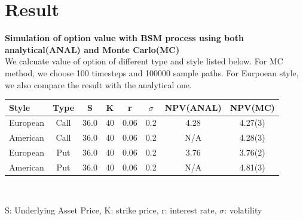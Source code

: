 \documentclass[a4paper]{article}
\begin{document}
\section{Result}
{\bf Simulation of option value with BSM process using both analytical(ANAL) and Monte Carlo(MC)}\\
We calcuate value of  option of different type and style listed below. For MC method, we choose 100 timesteps and 100000 sample paths. For Eurpoean style, we also compare the result with the analytical one.
\begin{table}
	\begin{tabular} { l  c  c   c  c  c       c       c          }
		Style 	 & Type & S  & K & r & $\sigma$ & NPV(ANAL) & NPV(MC)\\
	\hline 
		European & Call & 36.0 & 40 & 0.06 & 0.2 & 4.28 & 4.27(3) \\
		American & Call & 36.0 & 40 & 0.06 & 0.2 & N/A  & 4.28(3) \\
		European & Put  & 36.0 & 40 & 0.06 & 0.2 & 3.76 & 3.76(2) \\
		American & Put  & 36.0 & 40 & 0.06 & 0.2 & N/A  & 4.81(3) \\
	\hline
	\end{tabular}\\
	{\raggedright S: Underlying Asset Price, K: strike price, r: interest rate, 
	$\sigma$: volatility}
\end{table}
\end{document}
